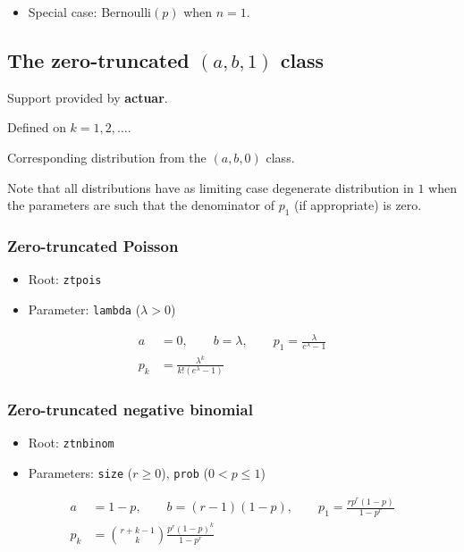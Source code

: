 \documentclass[x11names]{article}
\newcommand{\pkg}[1]{\textbf{#1}}
\newcommand{\code}[1]{\texttt{#1}}
\begin{document}
\begin{itemize}
\item Special case: Bernoulli$(p)$ when $n = 1$.
\end{itemize}


\subsection[The zero-truncated (a, b, 0) class]{The zero-truncated $(a, b, 1)$ class}
\label{sec:app:discrete:zt}

Support provided by \pkg{actuar}.

Defined on $k = 1, 2, \dots$.

Corresponding distribution from the $(a, b, 0)$ class.

Note that all distributions have as limiting case degenerate
distribution in $1$ when the parameters are such that the denominator
of $p_1$ (if appropriate) is zero.

\subsubsection{Zero-truncated Poisson}

\begin{itemize}
\item Root: \code{ztpois}
\item Parameter: \code{lambda} ($\lambda > 0$)
\end{itemize}
\begin{align*}
  a &= 0, \qquad b = \lambda, \qquad
      p_1 = \frac{\lambda}{e^\lambda - 1} \\
  p_k &= \frac{\lambda^k}{k! (e^\lambda - 1)}
\end{align*}

\subsubsection{Zero-truncated negative binomial}

\begin{itemize}
\item Root: \code{ztnbinom}
\item Parameters: \code{size} ($r \geq 0$),
  \code{prob} ($0 < p \leq 1$)
\end{itemize}
\begin{align*}
  a &= 1 - p, \qquad b = (r - 1)(1 - p), \qquad
      p_1 = \frac{r p^r (1 - p)}{1 - p^r} \\
  p_k &= \binom{r+k-1}{k} \frac{p^r (1 - p)^k}{1 - p^r}
\end{align*}
\end{document}
